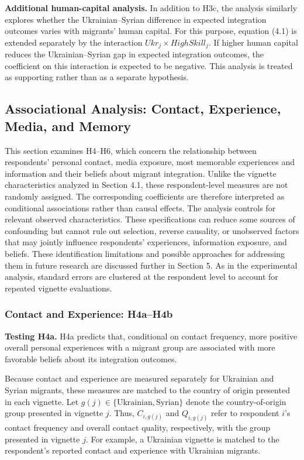 \noindent\textbf{Additional human-capital analysis.} In addition to H3c, the analysis similarly explores whether the 
Ukrainian–Syrian difference in expected integration outcomes varies with migrants’ human capital. For this purpose, 
equation (4.1) is extended separately by the interaction \(Ukr_j\times HighSkill_j\). If higher human capital reduces 
the Ukrainian–Syrian gap in expected integration outcomes, the coefficient on this interaction is expected to be 
negative. This analysis is treated as supporting rather than as a separate hypothesis.

\subsection{Associational Analysis: Contact, Experience, Media, and Memory}

This section examines H4–H6, which concern the relationship between respondents’ personal contact, 
media exposure, most memorable experiences and information and their beliefs about migrant integration. 
Unlike the vignette characteristics analyzed in Section 4.1, these respondent-level measures are not randomly 
assigned. The corresponding coefficients are therefore interpreted as conditional associations rather than 
causal effects. The analysis controls for relevant observed characteristics. These specifications can 
reduce some sources of confounding but cannot rule out selection, reverse causality, or unobserved factors that 
may jointly influence respondents' experiences, information exposure, and beliefs. These identification limitations 
and possible approaches for addressing them in future research are discussed further in Section 5. As in the 
experimental analysis, standard errors are clustered at the respondent level to account for repeated vignette evaluations.

\subsubsection{Contact and Experience: H4a–H4b}

\noindent\textbf{Testing H4a.} H4a predicts that, conditional on contact frequency, more positive overall personal 
experiences with a migrant group are associated with more favorable beliefs about its integration outcomes.

Because contact and experience are measured separately for Ukrainian and Syrian migrants, these measures are matched 
to the country of origin presented in each vignette. Let \(g(j)\in\{\mathrm{Ukrainian},\mathrm{Syrian}\}\) denote the 
country-of-origin group presented in vignette \(j\). Thus, \(C_{i,g(j)}\) and \(Q_{i,g(j)}\) refer to respondent \(i\)'s 
contact frequency and overall contact quality, respectively, with the group presented in vignette \(j\). 
For example, a Ukrainian vignette is matched to the respondent's reported contact and experience with Ukrainian migrants.

